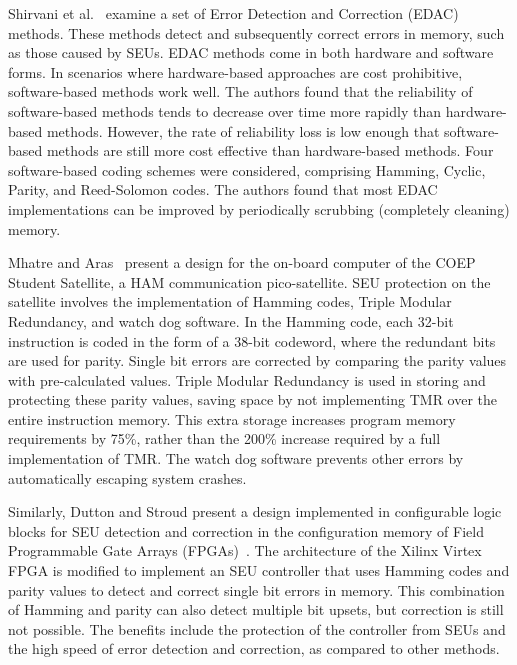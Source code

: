 Shirvani et al.~\cite{Shirvani2001EDAC} examine a set of Error Detection and Correction (EDAC) methods. These methods detect and subsequently correct errors in memory, such as those caused by SEUs. EDAC methods come in both hardware and software forms. In scenarios where hardware-based approaches are cost prohibitive, software-based methods work well. The authors found that the reliability of software-based methods tends to decrease over time more rapidly than hardware-based methods. However, the rate of reliability loss is low enough that software-based methods are still more cost effective than hardware-based methods. Four software-based coding schemes were considered, comprising Hamming, Cyclic, Parity, and Reed-Solomon codes. The authors found that most EDAC implementations can be improved by periodically scrubbing (completely cleaning) memory.

Mhatre and Aras~\cite{mhatreSeuTmr} present a design for the on-board computer of the COEP Student Satellite, a HAM communication pico-satellite. SEU protection on the satellite involves the implementation of Hamming codes, Triple Modular Redundancy, and watch dog software. In the Hamming code, each 32-bit instruction is coded in the form of a 38-bit codeword, where the redundant bits are used for parity. Single bit errors are corrected by comparing the parity values with pre-calculated values. Triple Modular Redundancy is used in storing and protecting these parity values, saving space by not implementing TMR over the entire instruction memory. This extra storage increases program memory requirements by 75\%, rather than the 200\% increase required by a full implementation of TMR. The watch dog software prevents other errors by automatically escaping system crashes.

Similarly, Dutton and Stroud present a design implemented in configurable logic blocks for SEU detection and correction in the configuration memory of Field Programmable Gate Arrays (FPGAs)~\cite{CATA09seuonVirtex}. The architecture of the Xilinx Virtex FPGA is modified to implement an SEU controller that uses Hamming codes and parity values to detect and correct single bit errors in memory. This combination of Hamming and parity can also detect multiple bit upsets, but correction is still not possible. The benefits include the protection of the controller from SEUs and the high speed of error detection and correction, as compared to other methods.




